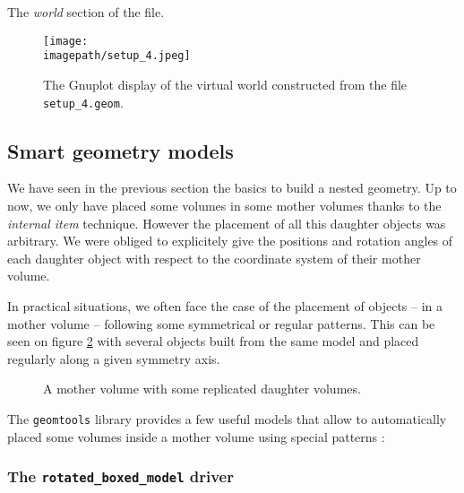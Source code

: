 \begin{sample}[h]
\caption{The \emph{world} section of the  file.}
\label{sample:setup_4:2}
\end{sample}

\begin{figure}[h]
\begin{center}
\texttt{[image: \\imagepath/setup\_4.jpeg]}
\end{center}
\caption{The Gnuplot  display of the  virtual world constructed
  from   the   file   \texttt{setup\_4.geom}.}\label{fig:setup_4:0}
\end{figure}

\clearpage

\subsection{Smart geometry models}

We have  seen in  the previous  section the basics  to build  a nested
geometry.  Up to now, we only  have placed some volumes in some mother
volumes  thanks to  the  \emph{internal item}  technique. However  the
placement of all this daughter  objects was arbitrary. We were obliged
to explicitely give the positions and rotation angles of each daughter
object with respect to the coordinate system of their mother volume.

In practical  situations, we often face  the case of  the placement of
objects -- in a mother volume -- following some symmetrical or regular
patterns. This  can be seen  on figure \ref{fig:smart:0}  with several
objects built from  the same model and placed  regularly along a given
symmetry axis.


\begin{figure}[h]
\begin{center}
\scalebox{0.75}{}
\end{center}
\caption{A mother volume with some replicated daughter volumes.}
\label{fig:smart:0}
\end{figure}

The \texttt{geomtools} library provides a few useful models that allow
to  automatically placed  some volumes  inside a  mother  volume using
special patterns :


\subsubsection{The \texttt{rotated\_boxed\_model} driver}

